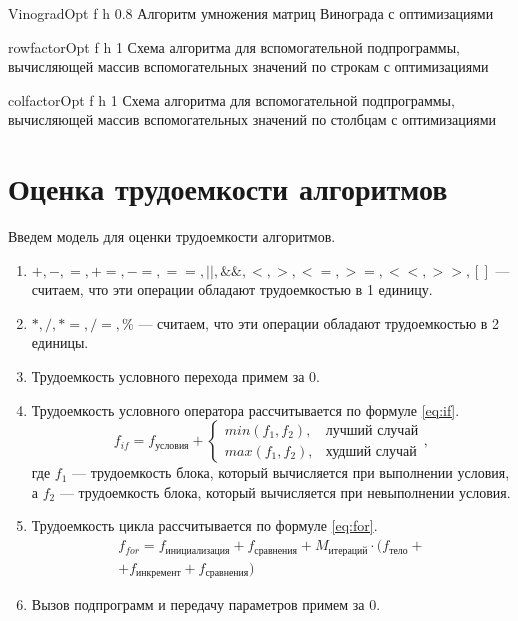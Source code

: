 {VinogradOpt} %
{f} %
{h} %
{0.8\textwidth} %
{Алгоритм умножения матриц Винограда с оптимизациями} %

{rowfactorOpt} %
{f} %
{h} %
{1\textwidth} %
{Схема алгоритма для вспомогательной подпрограммы, вычисляющей массив вспомогательных значений по строкам с оптимизациями} %

{colfactorOpt} %
{f} %
{h} %
{1\textwidth} %
{Схема алгоритма для вспомогательной подпрограммы, вычисляющей массив вспомогательных значений по столбцам с оптимизациями} %

\clearpage

\section{Оценка трудоемкости алгоритмов}

Введем модель для оценки трудоемкости алгоритмов.
\begin{enumerate}
	\item $+, -, =, +=, -=, ==, ||, \&\&, <, >, <=, >=, <<, >>, []$ --- считаем, что эти операции обладают трудоемкостью в 1 единицу.
	\item $*, /, *=, /=, \% $ --- считаем, что эти операции обладают трудоемкостью в 2 единицы.
	\item Трудоемкость условного перехода примем за $0$.
	\item Трудоемкость условного оператора рассчитывается по формуле \eqref{eq:if}. 
	\begin{equation}
		\label{eq:if}
		f_{if} = f_{\text{условия}} + 
		\begin{cases}
			min(f_1, f_2), & \text{лучший случай}\\
			max(f_1, f_2), & \text{худший случай}
		\end{cases},
	\end{equation}
	где $f_1$ --- трудоемкость блока, который вычисляется при выполнении условия, а $f_2$ --- трудоемкость блока, который вычисляется при невыполнении условия.
	\item Трудоемкость цикла рассчитывается по формуле \eqref{eq:for}.
	\begin{equation}
		\label{eq:for}
		\begin{gathered}
			f_{for} = f_{\text{инициализация}} + f_{\text{сравнения}} + M_{\text{итераций}} \cdot (f_{\text{тело}} +\\
			+ f_{\text{инкремент}} + f_{\text{сравнения}})
		\end{gathered}
	\end{equation}
	\item Вызов подпрограмм и передачу параметров примем за $0$.
\end{enumerate}

